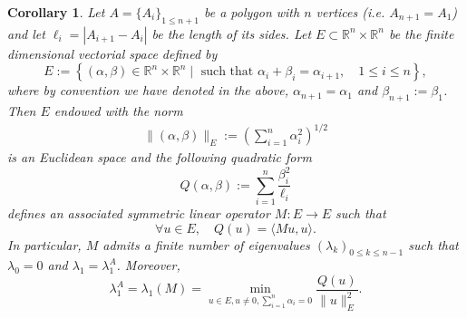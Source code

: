 \documentclass[12pt,english]{smfart} %
\newtheorem{corollary}[theorem]{Corollary}
\theoremstyle{remark}
\newcommand{\R}{\mathbb{R}}
\begin{document}
\medskip\begin{corollary} \label{spectrumfinite} Let  $A=\{A_i\}_{1\leqslant n+1}$  be a polygon with $n$ vertices  (i.e. $A_{n+1}=A_1$) and let $\ell_i=|A_{i+1}-A_i|$ be the length of its sides. Let  $E\subset \R^n \times \R^n$ be the finite dimensional vectorial space defined by
$$E:=\left\{(\alpha,\beta) \in \R^n \times \R^n  \;|\; \text{ such that }  \alpha_i+\beta_i =\alpha_{i+1} ,  \quad 1\leqslant i \leqslant n\right\},$$
where by convention we have denoted  in the above, $\alpha_{n+1}=\alpha_1$ and $\beta_{n+1}:=\beta_1$. Then  $E$  endowed with the norm  
\begin{eqnarray}
\|(\alpha,\beta)\|_E :=\left(\sum_{i=1}^n \alpha_i^2\right)^{1/2} \label{essS}
\end{eqnarray}
is an Euclidean space and the following quadratic form
$$Q(\alpha,\beta):=\sum_{i=1}^n \frac{\beta_i^2}{\ell_i}$$
defines an associated  symmetric linear operator $M:E\to E$ such that 
$$\forall  u \in E, \quad Q(u)=\langle M u , u \rangle.$$
In particular,  $M$ admits  a finite number of eigenvalues $(\lambda_k)_{0\leqslant k \leqslant n-1}$ such that  $\lambda_0=0$ and $\lambda_1=\lambda_1^A$.  Moreover,
$$\lambda_1^A=\lambda_1(M)=\min_{u \in E, u\not = 0, \sum_{i=1}^n\alpha_i=0} \frac{Q(u)}{\|u\|_E^2}.$$
\end{corollary}
\end{document}
